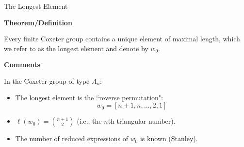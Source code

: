 \documentclass[10pt, compress,aspectratio=169,handout]{beamer}
\begin{document}
\begin{frame}{The Longest Element}\pause

\vspace{1em}

\begin{block}{\textbf{Theorem/Definition}}
\vspace{-.5em}

Every finite Coxeter group contains a unique element of maximal length, which we refer to as the \alert{longest element} and denote by $w_0$.  
\end{block}

\pause

\begin{block}{\textbf{Comments}}
\vspace{-.5em}

In the Coxeter group of type $A_n$: \pause

\vspace{-.5em}
\begin{itemize} 
\item The longest element is the ``reverse permutation":
\[
w_0 = [n+1, n, \ldots, 2, 1]
\]

\pause

\item $\ell(w_0)=\binom{n+1}{2}$ (i.e., the $n$th triangular number).

\pause 

\item The number of reduced expressions of $w_0$ is known (Stanley).
\end{itemize}
\end{block}

\end{frame}

\end{document}
